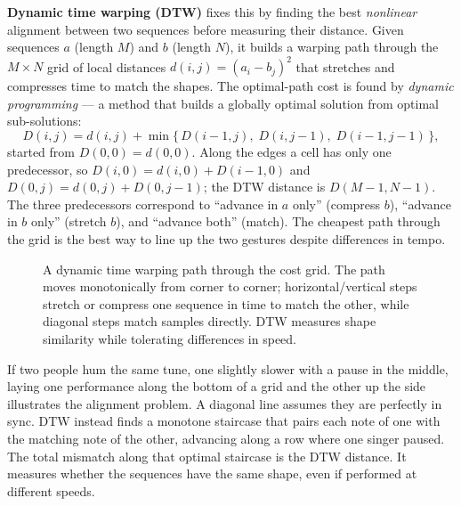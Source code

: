 \textbf{Dynamic time warping (DTW)} fixes this by finding the best
\emph{nonlinear} alignment between two sequences before measuring their distance.
Given sequences $a$ (length $M$) and $b$ (length $N$), it builds a warping path
through the $M\times N$ grid of local distances $d(i,j) = (a_i - b_j)^2$ that
stretches and compresses time to match the shapes. The optimal-path cost is found
by \emph{dynamic programming} --- a method that builds a globally optimal solution from optimal sub-solutions:
\begin{equation}
\label{ch38:dtw-rec}
  D(i,j) = d(i,j) + \min\big\{\, D(i-1,j),\; D(i,j-1),\; D(i-1,j-1)\,\big\},
\end{equation}
started from $D(0,0)=d(0,0)$. Along the edges a cell has only one predecessor, so
$D(i,0) = d(i,0) + D(i-1,0)$ and $D(0,j) = d(0,j) + D(0,j-1)$; the DTW distance is
$D(M-1,N-1)$.
The three predecessors correspond to ``advance in $a$ only'' (compress $b$),
``advance in $b$ only'' (stretch $b$), and ``advance both'' (match). The cheapest
path through the grid is the best way to line up the two gestures despite
differences in tempo.

\begin{figure}[H]
\centering
{}
\caption{A dynamic time warping path through the cost grid. The path moves
monotonically from corner to corner; horizontal/vertical steps stretch or
compress one sequence in time to match the other, while diagonal steps match
samples directly. DTW measures shape similarity while tolerating differences in
speed.}
\label{ch38:fig-dtw}
\end{figure}

\begin{intuitionbox}
If two people hum the same tune, one slightly slower with a pause in the middle, laying one performance along the bottom of a grid and the other up the side illustrates the alignment problem. A diagonal line assumes they are perfectly in sync. DTW instead finds a monotone staircase that pairs each note of one with the matching note of the other, advancing along a row where one singer paused. The total mismatch along that optimal staircase is the DTW distance. It measures whether the sequences have the same shape, even if performed at different speeds.
\end{intuitionbox}

